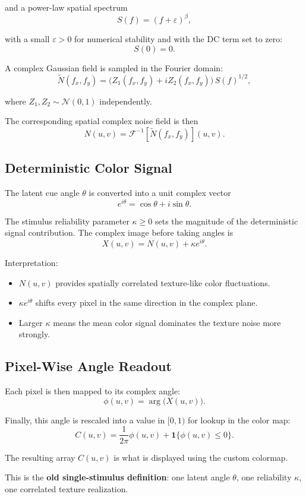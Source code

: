 \documentclass[11pt]{article}
\begin{document}
and a power-law spatial spectrum
\[
S(f) = (f + \varepsilon)^{\beta},
\]

with a small $\varepsilon > 0$ for numerical stability and with the DC term
set to zero:
\[
S(0) = 0.
\]

A complex Gaussian field is sampled in the Fourier domain:
\[
\tilde{N}(f_x, f_y)
= \bigl(Z_1(f_x, f_y) + i Z_2(f_x, f_y)\bigr)\,S(f)^{1/2},
\]

where $Z_1, Z_2 \sim \mathcal{N}(0,1)$ independently.

The corresponding spatial complex noise field is then
\[
N(u,v) = \mathcal{F}^{-1}\!\left[\tilde{N}(f_x, f_y)\right](u,v).
\]

\subsection{Deterministic Color Signal}

The latent cue angle $\theta$ is converted into a unit complex vector
\[
e^{i\theta} = \cos\theta + i\sin\theta.
\]

The stimulus reliability parameter $\kappa \ge 0$ sets the magnitude of the
deterministic signal contribution. The complex image before taking angles is
\[
X(u,v) = N(u,v) + \kappa e^{i\theta}.
\]

Interpretation:
\begin{itemize}[leftmargin=2em]
\item $N(u,v)$ provides spatially correlated texture-like color fluctuations.
\item $\kappa e^{i\theta}$ shifts every pixel in the same direction in the
complex plane.
\item Larger $\kappa$ means the mean color signal dominates the texture noise
more strongly.
\end{itemize}

\subsection{Pixel-Wise Angle Readout}

Each pixel is then mapped to its complex angle:
\[
\phi(u,v) = \arg\bigl(X(u,v)\bigr).
\]

Finally, this angle is rescaled into a value in $[0,1)$ for lookup in the
color map:
\[
C(u,v) = \frac{1}{2\pi}\phi(u,v) + \mathbf{1}\{\phi(u,v) \le 0\}.
\]

The resulting array $C(u,v)$ is what is displayed using the custom colormap.

This is the \textbf{old single-stimulus definition}: one latent angle
$\theta$, one reliability $\kappa$, one correlated texture realization.
\end{document}
